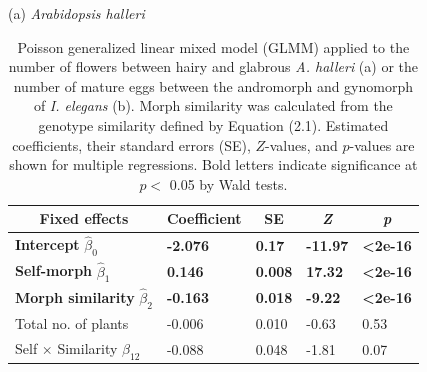 \documentclass[12pt,]{article}
\begin{document}
\begin{table}[ht]
\caption{Poisson generalized linear mixed model (GLMM) applied to the number of flowers between hairy and glabrous \textit{A. halleri} (a) or the number of mature eggs between the andromorph and gynomorph of \textit{I. elegans} (b). Morph similarity was calculated from the genotype similarity defined by Equation (2.1). Estimated coefficients, their standard errors (SE), $Z$-values, and $p$-values are shown for multiple regressions. Bold letters indicate significance at $p<$ 0.05 by Wald tests.}
(a) \textit{Arabidopsis halleri} \\
\begin{tabular}{lllll}
\hline
\multicolumn{1}{c}{Fixed effects} & \multicolumn{1}{c}{Coefficient} & \multicolumn{1}{c}{SE} & \multicolumn{1}{c}{\textit{Z}} & \multicolumn{1}{c}{\textit{p}} \\ \hline
\textbf{Intercept} $\hat{\beta}_{0}$    & \textbf{-2.076}  &  \textbf{0.17} & \textbf{-11.97} & \textbf{\textless{}2e-16}  \\
\textbf{Self-morph} $\hat{\beta}_{1}$      & \textbf{0.146}                  & \textbf{0.008}         & \textbf{17.32}                 & \textbf{\textless{}2e-16}      \\
\textbf{Morph similarity} $\hat{\beta}_{2}$        & \textbf{-0.163}                 & \textbf{0.018}         & \textbf{-9.22}                 & \textbf{\textless{}2e-16}      \\
Total no. of plants               & -0.006                          & 0.010                  & -0.63                          & 0.53                           \\
Self $\times$ Similarity $\hat{\beta}_{12}$            & -0.088                          & 0.048                  & -1.81                          & 0.07                           \\ \hline
\end{tabular}

\vspace*{5mm}


\end{table}
\end{document}

